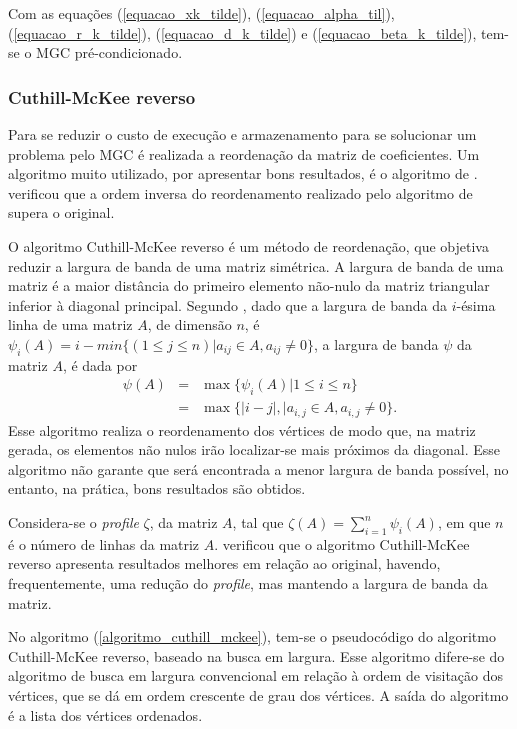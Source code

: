 Com as equações (\ref{equacao_xk_tilde}), (\ref{equacao_alpha_til}), (\ref{equacao_r_k_tilde}), (\ref{equacao_d_k_tilde}) e (\ref{equacao_beta_k_tilde}), tem-se o MGC pré-condicionado.

\subsubsection{Cuthill-McKee reverso} 
\label{cap_cuthill_mckee_reverso}
Para se reduzir o custo de execução e armazenamento para se solucionar um problema pelo MGC é realizada a reordenação da matriz de coeficientes. Um algoritmo muito utilizado, por apresentar bons resultados, é o algoritmo de .  verificou que a ordem inversa do reordenamento realizado pelo algoritmo de  supera o original.

O algoritmo Cuthill-McKee reverso é um método de reordenação, que objetiva reduzir a largura de banda de uma matriz simétrica. A largura de banda de uma matriz é a maior distância do primeiro elemento não-nulo da matriz triangular inferior à diagonal principal. Segundo , dado que a largura de banda da $i$-ésima linha de uma matriz $A$, de dimensão $n$, é $\psi_i(A) = i - min\{ (1 \leq j \leq n) | a_{ij} \in A, a_{ij} \neq 0 \}$, a largura de banda $\psi$ da matriz $A$, é dada por 
\begin{eqnarray}
\psi(A) &=& \max \{\psi_i(A) |  1 \leq i \leq n \} \nonumber \\
        &=& \max \{ |i - j|, | a_{i,j} \in A, a_{i,j} \neq 0 \}. \nonumber
\end{eqnarray}
Esse algoritmo realiza o reordenamento dos vértices de modo que, na matriz gerada, os elementos não nulos irão localizar-se mais próximos da diagonal. Esse algoritmo não garante que será encontrada a menor largura de banda possível, no entanto, na prática, bons resultados são obtidos. 

Considera-se o {\it profile} $\zeta$, da matriz $A$, tal que $\zeta(A) = \sum_ {i=1}^{n} \psi_i(A)$, em que $n$ é o número de linhas da matriz $A$.  verificou que o algoritmo Cuthill-McKee reverso apresenta resultados melhores em relação ao original, havendo, frequentemente, uma redução do {\it profile}, mas mantendo a largura de banda da matriz. 

No algoritmo (\ref{algoritmo_cuthill_mckee}), tem-se o pseudocódigo do algoritmo Cuthill-McKee reverso, baseado na busca em largura. Esse algoritmo difere-se do algoritmo de busca em largura convencional em relação à ordem de visitação dos vértices, que se dá em ordem crescente de grau dos vértices. A saída do algoritmo é a lista dos vértices ordenados.

